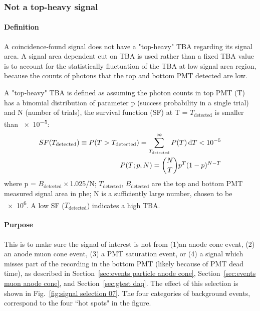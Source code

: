\subsubsection{Not a top-heavy signal} %
\label{sec:cuts top heavy}	
\paragraph{Definition}
A coincidence-found signal does not have a "top-heavy" TBA regarding its signal area. A signal area dependent cut on TBA is used rather than a fixed TBA value is to account for the statistically fluctuation of the TBA at low signal area region, because the counts of photons that the top and bottom PMT detected are low. 

A "top-heavy" TBA is defined as assuming the photon counts in top PMT (T) has a binomial distribution of parameter p (success probability in a single trial) and N (number of trials), the survival function (SF) at T = $T_{\text{detected}}$ is smaller than \num{e-5}:
\begin{align}
	SF (T_{\text{detected}}) \equiv P(T > T_{\text{detected}}) = \sum_{T_{\text{detected}}}^{\infty} P (T) \operatorname{d}\!{T}< \num{e-5} \\
	P (T; p, N) = \binom{N}{T} p^{T} (1-p)^{N-T}
\end{align}    
where p = $B_{\text{detected}} \times$\num{1.025}/N; $T_{\text{detected}}$, $B_{\text{detected}}$ are the top and bottom PMT measured signal area in \si{phe}; N is a sufficiently large number, chosen to be \num{e6}. A low SF ($T_{\text{detected}}$) indicates a high TBA. 

\paragraph{Purpose}
This is to make sure the signal of interest is not from (1)an anode cone event, (2) an anode muon cone event, (3) a PMT saturation event, or (4) a signal which misses part of the recording in the bottom PMT (likely because of PMT dead time), as described in Section~\ref{sec:events particle anode cone}, Section~\ref{sec:events muon anode cone}, and Section~\ref{sec:gtest daq}. The effect of this selection is shown in Fig.~\ref{fig:signal selection 07}. The four categories of background events, correspond to the four ``hot spots" in the figure. 

